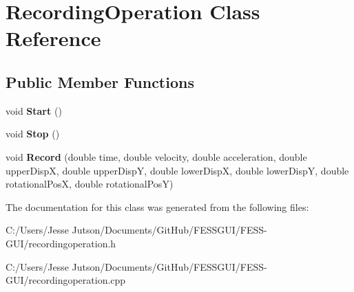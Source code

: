 \hypertarget{class_recording_operation}{}\section{Recording\+Operation Class Reference}
\label{class_recording_operation}
\subsection*{Public Member Functions}
\begin{DoxyCompactItemize}
\item 
\hypertarget{class_recording_operation_a9de73122788d5da0a2d747ae73df9bdf}{}\label{class_recording_operation_a9de73122788d5da0a2d747ae73df9bdf} 
void {\bfseries Start} ()
\item 
\hypertarget{class_recording_operation_afa9953a7cdce60344d090eb95a4d0d13}{}\label{class_recording_operation_afa9953a7cdce60344d090eb95a4d0d13} 
void {\bfseries Stop} ()
\item 
\hypertarget{class_recording_operation_a1a341c41178b05e95bc434510dfeedca}{}\label{class_recording_operation_a1a341c41178b05e95bc434510dfeedca} 
void {\bfseries Record} (double time, double velocity, double acceleration, double upper\+DispX, double upper\+DispY, double lower\+DispX, double lower\+DispY, double rotational\+PosX, double rotational\+PosY)
\end{DoxyCompactItemize}


The documentation for this class was generated from the following files\+:\begin{DoxyCompactItemize}
\item 
C\+:/\+Users/\+Jesse Jutson/\+Documents/\+Git\+Hub/\+F\+E\+S\+S\+G\+U\+I/\+F\+E\+S\+S-\/\+G\+U\+I/recordingoperation.\+h\item 
C\+:/\+Users/\+Jesse Jutson/\+Documents/\+Git\+Hub/\+F\+E\+S\+S\+G\+U\+I/\+F\+E\+S\+S-\/\+G\+U\+I/recordingoperation.\+cpp\end{DoxyCompactItemize}
